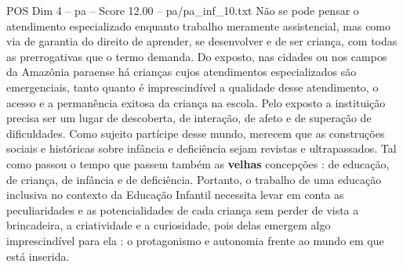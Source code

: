 \begin{textsample}{POS Dim 4 – pa – Score 12.00 – pa/pa\_inf\_10.txt}
Não se pode pensar o atendimento especializado enquanto trabalho meramente assistencial, mas como via de garantia do direito de aprender, se desenvolver e de ser criança, com todas as prerrogativas que o termo demanda.
Do exposto, nas cidades ou nos campos da Amazônia paraense há crianças cujos atendimentos especializados são emergenciais, tanto quanto é imprescindível a qualidade desse atendimento, o acesso e a permanência exitosa da criança na escola.
Pelo exposto a instituição precisa ser um lugar de descoberta, de interação, de afeto e de superação de dificuldades.
Como sujeito partícipe desse mundo, merecem que as construções sociais e históricas sobre infância e deficiência sejam revistas e ultrapassados.
Tal como passou o tempo que passem também as \textbf{velhas} concepções : de educação, de criança, de infância e de deficiência.
Portanto, o trabalho de uma educação inclusiva no contexto da Educação Infantil necessita levar em conta as peculiaridades e as potencialidades de cada criança sem perder de vista a brincadeira, a criatividade e a curiosidade, pois delas emergem algo imprescindível para ela : o protagonismo e autonomia frente ao mundo em que está inserida.

\end{textsample}
